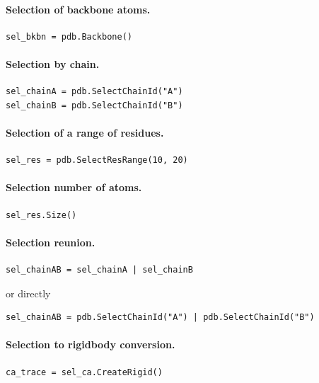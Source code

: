 \documentclass[12pt,a4paper]{article}
\begin{document}
\paragraph{Selection of backbone atoms.}
\begin{verbatim}
sel_bkbn = pdb.Backbone()
\end{verbatim}


\paragraph{Selection by chain.}
\begin{verbatim}
sel_chainA = pdb.SelectChainId("A")
sel_chainB = pdb.SelectChainId("B")
\end{verbatim}


\paragraph{Selection of a range of residues.}
\begin{verbatim}
sel_res = pdb.SelectResRange(10, 20)
\end{verbatim}


\paragraph{Selection number of atoms.}
\begin{verbatim}
sel_res.Size()
\end{verbatim}



\paragraph{Selection reunion.}
\begin{verbatim}
sel_chainAB = sel_chainA | sel_chainB
\end{verbatim}
or directly
\begin{verbatim}
sel_chainAB = pdb.SelectChainId("A") | pdb.SelectChainId("B")
\end{verbatim}


\paragraph{Selection to rigidbody conversion.}
\begin{verbatim}
ca_trace = sel_ca.CreateRigid()
\end{verbatim}
\end{document}
